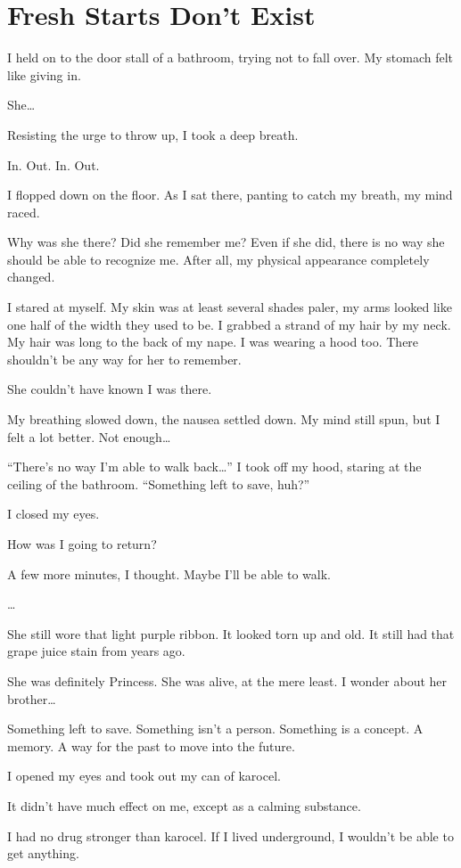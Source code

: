 \section{Fresh Starts Don’t Exist}
I held on to the door stall of a bathroom, trying not to fall over. My stomach felt like giving in. 

She…

Resisting the urge to throw up, I took a deep breath.

In. Out. In. Out.

I flopped down on the floor. As I sat there, panting to catch my breath, my mind raced.

Why was she there? Did she remember me? Even if she did, there is no way she should be able to recognize me. After all, my physical appearance completely changed.

I stared at myself. My skin was at least several shades paler, my arms looked like one half of the width they used to be. I grabbed a strand of my hair by my neck. My hair was long to the back of my nape. I was wearing a hood too. There shouldn’t be any way for her to remember.

She couldn’t have known I was there.

My breathing slowed down, the nausea settled down. My mind still spun, but I felt a lot better. Not enough…

“There’s no way I’m able to walk back…” I took off my hood, staring at the ceiling of the bathroom. “Something left to save, huh?”

I closed my eyes. 

How was I going to return?

A few more minutes, I thought. Maybe I’ll be able to walk.

…

She still wore that light purple ribbon. It looked torn up and old. It still had that grape juice stain from years ago.

She was definitely Princess. She was alive, at the mere least. I wonder about her brother…

Something left to save. Something isn’t a person. Something is a concept. A memory. A way for the past to move into the future.

I opened my eyes and took out my can of karocel.

It didn’t have much effect on me, except as a calming substance. 

I had no drug stronger than karocel. If I lived underground, I wouldn’t be able to get anything.

